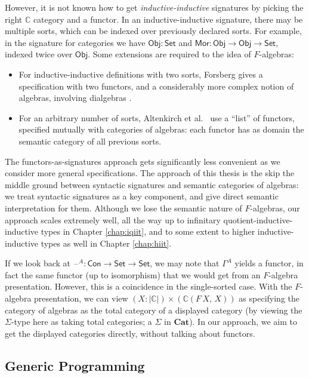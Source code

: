 \documentclass[12pt,a4paper,twoside,openany]{book}
\theoremstyle{remark}
\theoremstyle{definition}
\newcommand{\ms}[1]{\mathsf{#1}}
\newcommand{\mbb}[1]{\mathbb{#1}}
\newcommand{\mbf}[1]{\mathbf{#1}}
\newcommand{\Con}{\mathsf{Con}}
\newcommand{\blank}{\mathord{\hspace{1pt}\text{--}\hspace{1pt}}}
\newcommand{\Set}{\mathsf{Set}}
\newcommand{\Mor}{\ms{Mor}}
\newcommand{\Obj}{\ms{Obj}}
\begin{document}
However, it is not known how to get \emph{inductive-inductive} signatures by
picking the right $\mbb{C}$ category and a functor. In an inductive-inductive
signature, there may be multiple sorts, which can be indexed over previously
declared sorts. For example, in the signature for categories we have $\Obj :
\Set$ and $\Mor : \Obj \to \Obj \to \Set$, indexed twice over $\Obj$. Some
extensions are required to the idea of $F$-algebras:
\begin{itemize}
\item
  For inductive-inductive definitions with two sorts, Forsberg gives a
  specification with two functors, and a considerably more complex notion of
  algebras, involving dialgebras \cite{forsberg-phd}.
\item
  For an arbitrary number of sorts, Altenkirch et
  al.\ \cite{altenkirch18qiit} use a ``list'' of functors, specified mutually
  with categories of algebras: each functor has as domain the semantic category
  of all previous sorts.
\end{itemize}

The functors-as-signatures approach gets significantly less convenient as we
consider more general specifications. The approach of this thesis is the skip the
middle ground between syntactic signatures and semantic categories of algebras:
we treat syntactic signatures as a key component, and give direct semantic
interpretation for them. Although we lose the semantic nature of $F$-algebras,
our approach scales extremely well, all the way up to infinitary
quotient-inductive-inductive types in Chapter \ref{chap:iqiit}, and to some
extent to higher inductive-inductive types as well in Chapter \ref{chap:hiit}.

If we look back at $\blank^A : \Con \to \Set \to \Set$, we may note that
$\Gamma^A$ yields a functor, in fact the same functor (up to isomorphism) that
we would get from an $F$-algebra presentation. However, this is a coincidence in
the single-sorted case. With the $F$-algebra presentation, we can view $(X :
|\mbb{C}|) \times (\mbb{C}(F\,X,\,X))$ as specifying the category of algebras as
the total category of a displayed category (by viewing the $\Sigma$-type here as
taking total categories; a $\Sigma$ in $\mbf{Cat}$). In our approach, we aim to
get the displayed categories directly, without talking about functors.

\subsection{Generic Programming}
\end{document}
